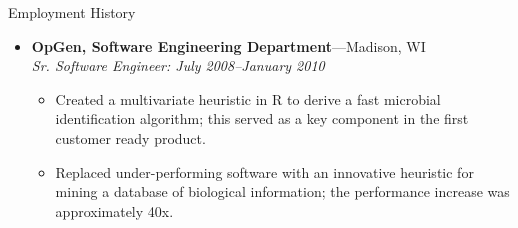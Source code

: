 \documentclass[11pt,oneside]{article}
\newenvironment{ressectionx}[1]{
	\vspace{4pt}
	{\fontfamily{phv}\selectfont\Large#1}
	\begin{itemize}[label={}]
	\vspace{3pt}
}{
	\end{itemize}
}
\newcommand{\ressubitem}[1]{
	\vspace{-1pt}
	\item \begin{flushleft} #1 \end{flushleft}
}
\newcommand{\resbigitem}[3]{
	\vspace{-5pt}
	\item
	\textbf{#1}---#2 \\
	\textit{#3}
}
\newenvironment{ressubsec}[3]{
	\resbigitem{#1}{#2}{#3}
	\vspace{-2pt}
	\begin{itemize}
}{
	\end{itemize}
}
\begin{document}
\begin{ressectionx}{Employment History}
	\begin{ressubsec}{OpGen, Software Engineering Department}{Madison, WI}{Sr. Software Engineer: July 2008--January 2010}
		\ressubitem{Created a multivariate heuristic in R to derive a fast microbial identification algorithm; this served as a key component in the first customer ready product.}
	\ressubitem{Replaced under-performing software with an innovative heuristic for mining a database of biological information; the performance increase was approximately 40x.}

	\end{ressubsec}


\end{ressectionx}
\end{document}
